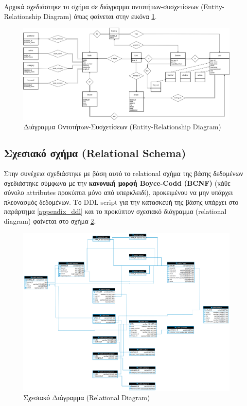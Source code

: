 \documentclass[a4paper]{article}
\begin{document}
\par Αρχικά σχεδιάστηκε το σχήμα σε διάγραμμα οντοτήτων-συσχετίσεων (Entity-Relationship Diagram) όπως φαίνεται στην εικόνα \ref{er_diagram}.

\begin{figure}[H]
    \centering
    \includegraphics[width=\textwidth]{images/er.png}
    \caption{Διάγραμμα Οντοτήτων-Συσχετίσεων (Entity-Relationship Diagram)}
    \label{er_diagram}
\end{figure}

\subsection{Σχεσιακό σχήμα (Relational Schema)}

\par Στην συνέχεια σχεδιάστηκε με βάση αυτό το relational σχήμα της βάσης δεδομένων σχεδιάστηκε σύμφωνα με την \textbf{κανονική μορφή Boyce-Codd (BCNF)} (κάθε σύνολο attributes προκύπτει μόνο από υπερκλειδί), προκειμένου να μην υπάρχει πλεονασμός δεδομένων. Το DDL script για την κατασκευή της βάσης υπάρχει στο παράρτημα \ref{appendix_ddl} και το προκύπτον σχεσιακό διάγραμμα (relational diagram) φαίνεται στο σχήμα \ref{relational_diagram}.

\begin{figure}[H]
    \centering
    \includegraphics[width=\textwidth]{images/relational.png}
    \caption{Σχεσιακό Διάγραμμα (Relational Diagram)}
    \label{relational_diagram}
\end{figure}
\end{document}
